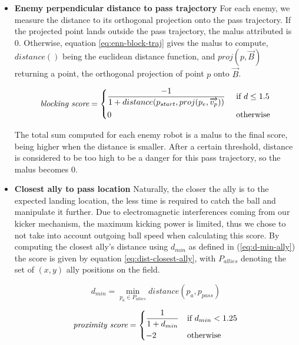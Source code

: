 \begin{itemize}
    \item \textbf{Enemy perpendicular distance to pass trajectory}
    For each enemy, we measure the distance to its orthogonal projection onto the pass trajectory.
    If the projected point lands outside the pass trajectory, the malus attributed is 0.
    Otherwise, equation \ref{eq:enn-block-traj} gives the malus to compute,
    $distance()$ being the euclidean distance function, and $proj(p, \vec{B})$ returning a point,
    the orthogonal projection of point $p$ onto $\vec{B}$.
    
    \begin{equation}
        \label{eq:enn-block-traj}
        \textit{blocking score} =
        \begin{dcases}
            \frac{-1}{1 + distance(p_{start}, proj(p_e, \overrightarrow{v_p}))} & \text{ if } d \leq 1.5 \\
            0 & \text{ otherwise}
        \end{dcases}
    \end{equation}

    The total sum computed for each enemy robot is a malus to the final score, being higher when the distance is smaller.
    After a certain threshold, distance is considered to be too high to be a danger for this pass 
    trajectory, so the malus becomes 0. \\

    \item \textbf{Closest ally to pass location}
    Naturally, the closer the ally is to the expected landing location, the less time is required
    to catch the ball and manipulate it further. Due to electromagnetic interferences coming
    from our kicker mechanism, the maximum kicking power is limited, thus we chose to not take into account outgoing ball speed
    when calculating this score. By computing the closest ally's distance using $d_{min}$ as defined in (\ref{eq:d-min-ally})
    the score is given by equation \ref{eq:dist-closest-ally}, with $P_{allies}$ denoting the set of $(x, y)$ ally positions on the field.
    
    \begin{equation}
        \label{eq:d-min-ally}
        d_{min} = \min_{p_a \in P_{allies}} distance(p_a, p_{pass})
    \end{equation}

    \begin{equation}
        \label{eq:dist-closest-ally}
        \textit{proximity score} =
        \begin{dcases}
            \frac{1}{1 + d_{min}} & \text{if } d_{min} < 1.25\\
            -2 & \text{otherwise}
        \end{dcases}
    \end{equation}


\end{itemize}
